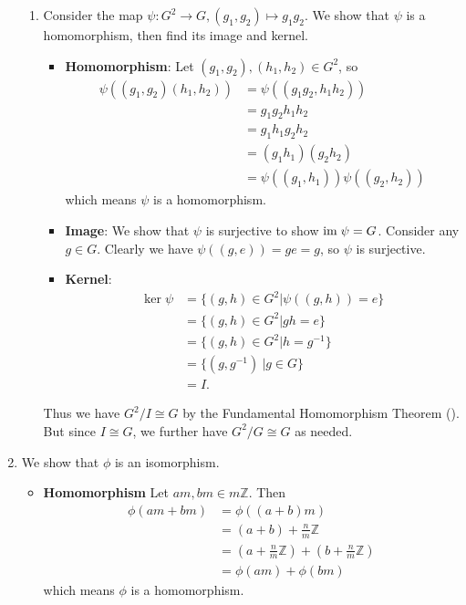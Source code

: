 \begin{enumerate}
\begin{enumerate}[label=(\roman*)]
        \item Consider the map $\psi: G^2 \to G, (g_1, g_2) \mapsto g_1g_2$. We show that $\psi$ is a homomorphism, then find its image and kernel.
        \begin{itemize}
            \item \textbf{Homomorphism}: Let $(g_1, g_2), (h_1, h_2) \in G^2$, so
            \begin{align*}
                \psi((g_1, g_2)(h_1, h_2)) &= \psi((g_1g_2, h_1h_2))\\
                &= g_1g_2h_1h_2\\
                &= g_1h_1g_2h_2\\
                &= (g_1h_1)(g_2h_2)\\
                &= \psi((g_1, h_1))\psi((g_2, h_2))
            \end{align*}
            which means $\psi$ is a homomorphism.

            \item \textbf{Image}: We show that $\psi$ is surjective to show $\mathrm{im}\; \psi = G$. Consider any $g \in G$. Clearly we have $\psi((g, e)) = ge = g$, so $\psi$ is surjective.
            
            \item \textbf{Kernel}:
            \begin{align*}
                \ker\psi &= \{(g, h) \in G^2 \vert \psi((g, h)) = e\}\\
                &= \{(g, h) \in G^2 \vert gh = e\}\\
                &= \{(g, h) \in G^2 \vert h = g^{-1}\}\\
                &= \{(g, g^{-1}) \ | g \in G\}\\
                &= I.
            \end{align*}
        \end{itemize}

        Thus we have $G^2 / I \cong G$ by the Fundamental Homomorphism Theorem (). But since $I \cong G$, we further have $G^2/G \cong G$ as needed.
    \end{enumerate}

    \item We show that $\phi$ is an isomorphism.
    \begin{itemize}
        \item \textbf{Homomorphism} Let $am, bm \in m\mathbb{Z}$. Then
        \begin{align*}
            \phi(am + bm) &= \phi((a+b)m)\\
            &= (a+b) + \frac nm \mathbb{Z}\\
            &= \left(a + \frac nm \mathbb{Z}\right) + \left(b + \frac nm \mathbb{Z}\right)\\
            &= \phi(am) + \phi(bm)
        \end{align*}
        which means $\phi$ is a homomorphism.


\end{itemize}
\end{enumerate}
